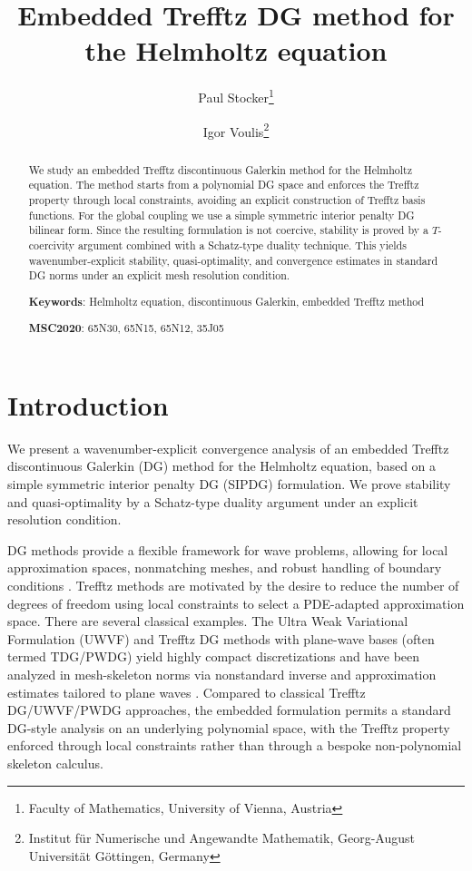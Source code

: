 \documentclass[11pt]{article}
\title{Embedded Trefftz DG method for the Helmholtz equation}
\author{ 
Paul Stocker\thanks{Faculty of Mathematics, University of Vienna, Austria} 
\and 
Igor Voulis\thanks{Institut für Numerische und Angewandte Mathematik, Georg-August Universität Göttingen, Germany}
}
\date{}
\theoremstyle{definition}
\theoremstyle{plain}
\begin{document}
\maketitle

\begin{abstract}
We study an embedded Trefftz discontinuous Galerkin method for the Helmholtz equation.
The method starts from a polynomial DG space and enforces the Trefftz property through local constraints, avoiding an explicit construction of Trefftz basis functions.
For the global coupling we use a simple symmetric interior penalty DG bilinear form.
Since the resulting formulation is not coercive, stability is proved by a $T$-coercivity argument combined with a Schatz-type duality technique.
This yields wavenumber-explicit stability, quasi-optimality, and convergence estimates in standard DG norms under an explicit mesh resolution condition.

\medskip
\noindent\textbf{Keywords}: 
Helmholtz equation,
discontinuous Galerkin,
embedded Trefftz method

\medskip
\noindent\textbf{MSC2020}:
65N30, 
65N15, 
65N12,
35J05
\end{abstract}


\section{Introduction}
We present a wavenumber-explicit convergence analysis of an embedded Trefftz discontinuous Galerkin (DG) method for the Helmholtz equation, based on a simple symmetric interior penalty DG (SIPDG) formulation.
We prove stability and quasi-optimality by a Schatz-type duality argument under an explicit resolution condition.

DG methods provide a flexible framework for wave problems, allowing for local approximation spaces, nonmatching meshes, and robust handling of boundary conditions \cite{ABCM02}.
Trefftz methods are motivated by the desire to reduce the number of degrees of freedom using local constraints to select a PDE-adapted approximation space.
There are several classical examples. The Ultra Weak Variational Formulation (UWVF) \cite{CD98,BM08} and
Trefftz DG methods with plane-wave bases (often termed TDG/PWDG) yield highly compact discretizations and have been analyzed in mesh-skeleton norms via nonstandard inverse and approximation estimates tailored to plane waves \cite{GHP09,HMP11,HMP16,HMP16pwdg}.
Compared to classical Trefftz DG/UWVF/PWDG approaches, the embedded formulation permits a standard DG-style analysis on an underlying polynomial space, with the Trefftz property enforced through local constraints rather than through a bespoke non-polynomial skeleton calculus.
\end{document}
